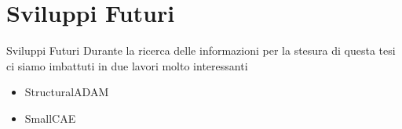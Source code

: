 \section{Sviluppi Futuri}

    \begin{frame}{Sviluppi Futuri}
        Durante la ricerca delle informazioni per la stesura di questa tesi ci siamo imbattuti in due lavori molto interessanti
        \begin{itemize}
            \item StructuralADAM\footnotemark[1]
            \item SmallCAE\footnotemark[2]
        \end{itemize}
    \end{frame}
    